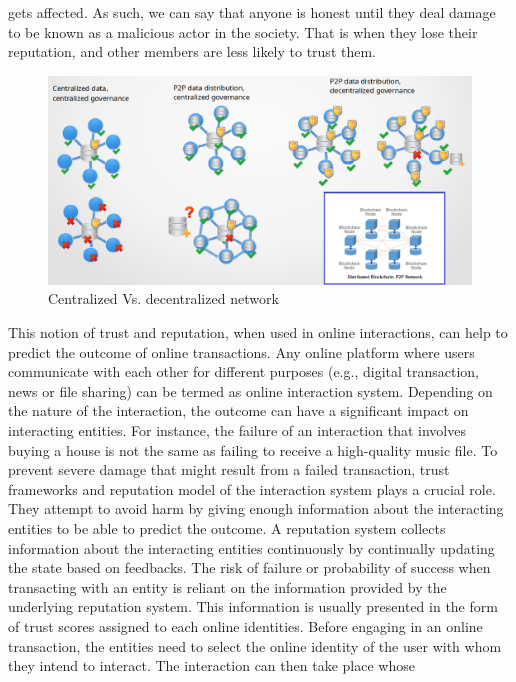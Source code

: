 gets affected. As such, we can say that anyone is honest until they deal damage
to be known as a malicious actor in the society. That is when they lose their
reputation, and other members are less likely to trust them. \par 
\begin{figure}
	\begin{center}
		\includegraphics[width=1.0\textwidth]{Images/WhyBlockchain.eps}
		\caption{Centralized Vs. decentralized network}
		\label{fig:WhyBlockchain}
	\end{center}
\end{figure}
This notion of trust and reputation, when used in online interactions, can help
to predict the outcome of online transactions. Any online platform where users
communicate with each other for different purposes (e.g., digital transaction,
news or file sharing) can be termed as online interaction system. Depending on
the nature of the interaction, the outcome can have a significant impact on
interacting entities. For instance, the failure of an interaction that involves
buying a house is not the same as failing to receive a high-quality music file.
To prevent severe damage that might result from a failed transaction, trust
frameworks and reputation model of the interaction system plays a crucial role.
They attempt to avoid harm by giving enough information about the interacting
entities to be able to predict the outcome. A reputation system collects
information about the interacting entities continuously by continually updating
the state based on feedbacks. The risk of failure or probability of success
when transacting with an entity is reliant on the information provided by the
underlying reputation system. This information is usually presented in the form
of trust scores assigned to each online identities. Before engaging in an
online transaction, the entities need to select the online identity of the user
with whom they intend to interact. The interaction can then take place whose
